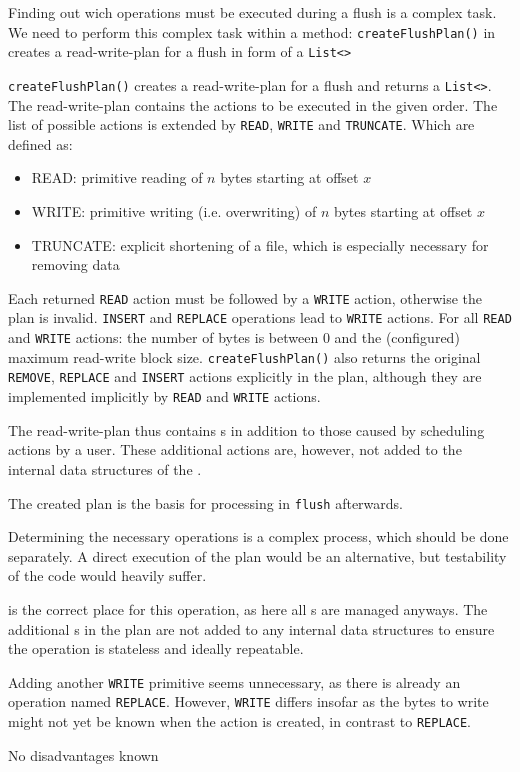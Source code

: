 Finding out wich operations must be executed during a flush is a complex task. We need to perform this complex task within a method:
{%
\texttt{createFlushPlan()} in \MediumChangeManager{} creates a read-write-plan for a flush in form of a \texttt{List<}\MediumAction{}\texttt{>}
}
{%
\texttt{createFlushPlan()} creates a read-write-plan for a flush and returns a \texttt{List<}\MediumAction{}\texttt{>}.  The read-write-plan contains the actions to be executed in the given order. The list of possible actions is extended by \texttt{READ}, \texttt{WRITE} and \texttt{TRUNCATE}. Which are defined as:
\begin{itemize}
\item READ: primitive reading of $n$ bytes starting at offset $x$
\item WRITE: primitive writing (i.e. overwriting) of $n$ bytes starting at offset $x$
\item TRUNCATE: explicit shortening of a file, which is especially necessary for removing data
\end{itemize}

Each returned \texttt{READ} action must be followed by a \texttt{WRITE} action, otherwise the plan is invalid. \texttt{INSERT} and \texttt{REPLACE} operations lead to \texttt{WRITE} actions. For all \texttt{READ} and \texttt{WRITE} actions: the number of bytes is between 0 and the (configured) maximum read-write block size. \texttt{createFlushPlan()} also returns the original \texttt{REMOVE}, \texttt{REPLACE} and \texttt{INSERT} actions explicitly in the plan, although they are implemented implicitly by \texttt{READ} and \texttt{WRITE} actions.

The read-write-plan thus contains \MediumAction{}s in addition to those caused by scheduling actions by a user. These additional actions are, however, not added to the internal data structures of the \MediumChangeManager{}.

The created plan is the basis for processing in \texttt{flush} afterwards.
}
{%
Determining the necessary operations is a complex process, which should be done separately. A direct execution of the plan would be an alternative, but testability of the code would heavily suffer.

\MediumChangeManager{} is the correct place for this operation, as here all \MediumAction{}s are managed anyways. The additional \MediumAction{}s in the plan are not added to any internal data structures to ensure the operation is stateless and ideally repeatable. 

Adding another \texttt{WRITE} primitive seems unnecessary, as there is already an operation named \texttt{REPLACE}. However, \texttt{WRITE} differs insofar as the bytes to write might not yet be known when the action is created, in contrast to \texttt{REPLACE}.
}
{%
No disadvantages known
}

